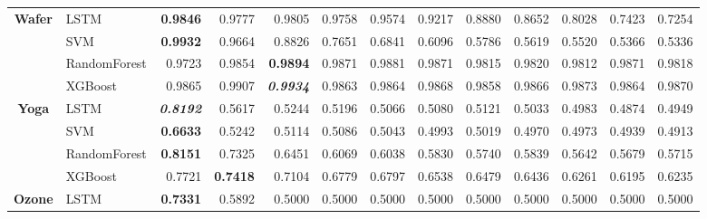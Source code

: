 \begin{table}[H]
\begin{adjustbox}{max width=14cm}
\begin{tabular}{|c|l|r|r|r|r|r|r|r|r|r|r|r|}
			\hline
			\textbf{Wafer}        & LSTM         & \textbf{0.9846}          & 0.9777          & 0.9805                   & 0.9758                   & 0.9574          & 0.9217                   & 0.8880 & 0.8652 & 0.8028                   & 0.7423          & 0.7254          \\
			                      & SVM          & \textbf{0.9932}          & 0.9664          & 0.8826                   & 0.7651                   & 0.6841          & 0.6096                   & 0.5786 & 0.5619 & 0.5520                   & 0.5366          & 0.5336          \\
			                      & RandomForest & 0.9723                   & 0.9854          & \textbf{0.9894}          & 0.9871                   & 0.9881          & 0.9871                   & 0.9815 & 0.9820 & 0.9812                   & 0.9871          & 0.9818          \\
			                      & XGBoost      & 0.9865                   & 0.9907          & \textit{\textbf{0.9934}} & 0.9863                   & 0.9864          & 0.9868                   & 0.9858 & 0.9866 & 0.9873                   & 0.9864          & 0.9870          \\
			\hline
			\textbf{Yoga}         & LSTM         & \textit{\textbf{0.8192}} & 0.5617          & 0.5244                   & 0.5196                   & 0.5066          & 0.5080                   & 0.5121 & 0.5033 & 0.4983                   & 0.4874          & 0.4949          \\
			                      & SVM          & \textbf{0.6633}          & 0.5242          & 0.5114                   & 0.5086                   & 0.5043          & 0.4993                   & 0.5019 & 0.4970 & 0.4973                   & 0.4939          & 0.4913          \\
			                      & RandomForest & \textbf{0.8151}          & 0.7325          & 0.6451                   & 0.6069                   & 0.6038          & 0.5830                   & 0.5740 & 0.5839 & 0.5642                   & 0.5679          & 0.5715          \\
			                      & XGBoost      & 0.7721                   & \textbf{0.7418} & 0.7104                   & 0.6779                   & 0.6797          & 0.6538                   & 0.6479 & 0.6436 & 0.6261                   & 0.6195          & 0.6235          \\
			\hline
			\textbf{Ozone}        & LSTM         & \textbf{0.7331}          & 0.5892          & 0.5000                   & 0.5000                   & 0.5000          & 0.5000                   & 0.5000 & 0.5000 & 0.5000                   & 0.5000          & 0.5000          \\

\end{tabular}
\end{adjustbox}
\end{table}
